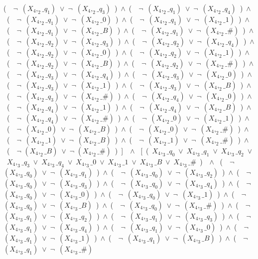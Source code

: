 ﻿\documentclass[a4paper,10pt]{article}
\begin{document}
(\ \ $\neg$\ $(X_4,_2\_q_1)$\ $\vee$\ $\neg$\ $(X_4,_2\_q_3)$\ )\ $\wedge$\ (\ \ $\neg$\ $(X_4,_2\_q_1)$\ $\vee$\ $\neg$\ $(X_4,_2\_q_4)$\ )\ $\wedge$\ (\ \ $\neg$\ $(X_4,_2\_q_1)$\ $\vee$\ $\neg$\ $(X_4,_2\_0)$\ )\ $\wedge$\ (\ \ $\neg$\ $(X_4,_2\_q_1)$\ $\vee$\ $\neg$\ $(X_4,_2\_1)$\ )\ $\wedge$\ (\ \ $\neg$\ $(X_4,_2\_q_1)$\ $\vee$\ $\neg$\ $(X_4,_2\_B)$\ )\ $\wedge$\ (\ \ $\neg$\ $(X_4,_2\_q_1)$\ $\vee$\ $\neg$\ $(X_4,_2\_\#)$\ )\ $\wedge$\ (\ \ $\neg$\ $(X_4,_2\_q_2)$\ $\vee$\ $\neg$\ $(X_4,_2\_q_3)$\ )\ $\wedge$\ (\ \ $\neg$\ $(X_4,_2\_q_2)$\ $\vee$\ $\neg$\ $(X_4,_2\_q_4)$\ )\ $\wedge$\ (\ \ $\neg$\ $(X_4,_2\_q_2)$\ $\vee$\ $\neg$\ $(X_4,_2\_0)$\ )\ $\wedge$\ (\ \ $\neg$\ $(X_4,_2\_q_2)$\ $\vee$\ $\neg$\ $(X_4,_2\_1)$\ )\ $\wedge$\ (\ \ $\neg$\ $(X_4,_2\_q_2)$\ $\vee$\ $\neg$\ $(X_4,_2\_B)$\ )\ $\wedge$\ (\ \ $\neg$\ $(X_4,_2\_q_2)$\ $\vee$\ $\neg$\ $(X_4,_2\_\#)$\ )\ $\wedge$\ (\ \ $\neg$\ $(X_4,_2\_q_3)$\ $\vee$\ $\neg$\ $(X_4,_2\_q_4)$\ )\ $\wedge$\ (\ \ $\neg$\ $(X_4,_2\_q_3)$\ $\vee$\ $\neg$\ $(X_4,_2\_0)$\ )\ $\wedge$\ (\ \ $\neg$\ $(X_4,_2\_q_3)$\ $\vee$\ $\neg$\ $(X_4,_2\_1)$\ )\ $\wedge$\ (\ \ $\neg$\ $(X_4,_2\_q_3)$\ $\vee$\ $\neg$\ $(X_4,_2\_B)$\ )\ $\wedge$\ (\ \ $\neg$\ $(X_4,_2\_q_3)$\ $\vee$\ $\neg$\ $(X_4,_2\_\#)$\ )\ $\wedge$\ (\ \ $\neg$\ $(X_4,_2\_q_4)$\ $\vee$\ $\neg$\ $(X_4,_2\_0)$\ )\ $\wedge$\ (\ \ $\neg$\ $(X_4,_2\_q_4)$\ $\vee$\ $\neg$\ $(X_4,_2\_1)$\ )\ $\wedge$\ (\ \ $\neg$\ $(X_4,_2\_q_4)$\ $\vee$\ $\neg$\ $(X_4,_2\_B)$\ )\ $\wedge$\ (\ \ $\neg$\ $(X_4,_2\_q_4)$\ $\vee$\ $\neg$\ $(X_4,_2\_\#)$\ )\ $\wedge$\ (\ \ $\neg$\ $(X_4,_2\_0)$\ $\vee$\ $\neg$\ $(X_4,_2\_1)$\ )\ $\wedge$\ (\ \ $\neg$\ $(X_4,_2\_0)$\ $\vee$\ $\neg$\ $(X_4,_2\_B)$\ )\ $\wedge$\ (\ \ $\neg$\ $(X_4,_2\_0)$\ $\vee$\ $\neg$\ $(X_4,_2\_\#)$\ )\ $\wedge$\ (\ \ $\neg$\ $(X_4,_2\_1)$\ $\vee$\ $\neg$\ $(X_4,_2\_B)$\ )\ $\wedge$\ (\ \ $\neg$\ $(X_4,_2\_1)$\ $\vee$\ $\neg$\ $(X_4,_2\_\#)$\ )\ $\wedge$\ (\ \ $\neg$ $(X_4,_2\_B)$\ $\vee$\ $\neg$ $(X_4,_2\_\#)$\ )\ ]\ \ $\wedge$ \ [\ (\ $X_4,_3\_q_0$\ $\vee$\ $X_4,_3\_q_1$\ $\vee$\ $X_4,_3\_q_2$\ $\vee$\ $X_4,_3\_q_3$\ $\vee$\ $X_4,_3\_q_4$\ $\vee$\ $X_4,_3\_0$\ $\vee$\ $X_4,_3\_1$\ $\vee$\ $X_4,_3\_B$\ $\vee$\ $X_4,_3\_\#$\ )\ \ $\wedge$ \ (\ \ $\neg$\ $(X_4,_3\_q_0)$\ $\vee$\ $\neg$\ $(X_4,_3\_q_1)$\ )\ $\wedge$\ (\ \ $\neg$\ $(X_4,_3\_q_0)$\ $\vee$\ $\neg$\ $(X_4,_3\_q_2)$\ )\ $\wedge$\ (\ \ $\neg$\ $(X_4,_3\_q_0)$\ $\vee$\ $\neg$\ $(X_4,_3\_q_3)$\ )\ $\wedge$\ (\ \ $\neg$\ $(X_4,_3\_q_0)$\ $\vee$\ $\neg$\ $(X_4,_3\_q_4)$\ )\ $\wedge$\ (\ \ $\neg$\ $(X_4,_3\_q_0)$\ $\vee$\ $\neg$\ $(X_4,_3\_0)$\ )\ $\wedge$\ (\ \ $\neg$\ $(X_4,_3\_q_0)$\ $\vee$\ $\neg$\ $(X_4,_3\_1)$\ )\ $\wedge$\ (\ \ $\neg$\ $(X_4,_3\_q_0)$\ $\vee$\ $\neg$\ $(X_4,_3\_B)$\ )\ $\wedge$\ (\ \ $\neg$\ $(X_4,_3\_q_0)$\ $\vee$\ $\neg$\ $(X_4,_3\_\#)$\ )\ $\wedge$\ (\ \ $\neg$\ $(X_4,_3\_q_1)$\ $\vee$\ $\neg$\ $(X_4,_3\_q_2)$\ )\ $\wedge$\ (\ \ $\neg$\ $(X_4,_3\_q_1)$\ $\vee$\ $\neg$\ $(X_4,_3\_q_3)$\ )\ $\wedge$\ (\ \ $\neg$\ $(X_4,_3\_q_1)$\ $\vee$\ $\neg$\ $(X_4,_3\_q_4)$\ )\ $\wedge$\ (\ \ $\neg$\ $(X_4,_3\_q_1)$\ $\vee$\ $\neg$\ $(X_4,_3\_0)$\ )\ $\wedge$\ (\ \ $\neg$\ $(X_4,_3\_q_1)$\ $\vee$\ $\neg$\ $(X_4,_3\_1)$\ )\ $\wedge$\ (\ \ $\neg$\ $(X_4,_3\_q_1)$\ $\vee$\ $\neg$\ $(X_4,_3\_B)$\ )\ $\wedge$\ (\ \ $\neg$\ $(X_4,_3\_q_1)$\ $\vee$\ $\neg$\ $(X_4,_3\_\#)$\ 
\end{document}
